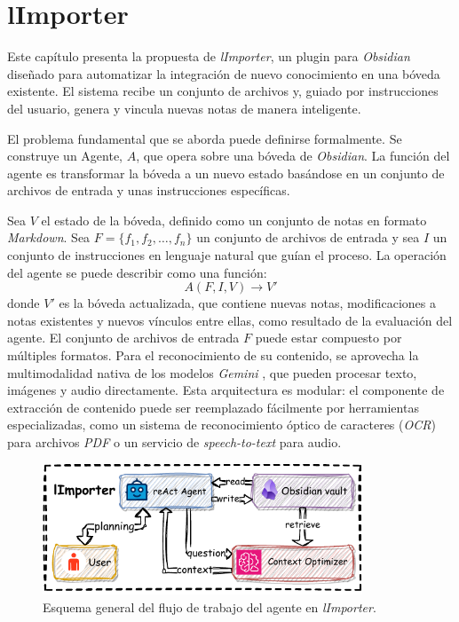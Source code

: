\chapter{lImporter}\label{chapter:proposal}
Este capítulo presenta la propuesta de \textit{lImporter}, un plugin para \textit{Obsidian} diseñado para automatizar la integración de nuevo conocimiento en una bóveda existente. El sistema recibe un conjunto de archivos y, guiado por instrucciones del usuario, genera y vincula nuevas notas de manera inteligente.

El problema fundamental que se aborda puede definirse formalmente. Se construye un Agente, $A$, que opera sobre una bóveda de \textit{Obsidian}. La función del agente es transformar la bóveda a un nuevo estado basándose en un conjunto de archivos de entrada y unas instrucciones específicas.

Sea $V$ el estado de la bóveda, definido como un conjunto de notas en formato \textit{Markdown}. Sea $F = \{f_1, f_2, \dots, f_n\}$ un conjunto de archivos de entrada y sea $I$ un conjunto de instrucciones en lenguaje natural que guían el proceso. La operación del agente se puede describir como una función:
\[ A(F, I, V) \rightarrow V' \]
donde $V'$ es la bóveda actualizada, que contiene nuevas notas, modificaciones a notas existentes y nuevos vínculos entre ellas, como resultado de la evaluación del agente. El conjunto de archivos de entrada $F$ puede estar compuesto por múltiples formatos. Para el reconocimiento de su contenido, se aprovecha la multimodalidad nativa de los modelos \textit{Gemini} \parencite{teamGeminiFamilyHighly2024}, que pueden procesar texto, imágenes y audio directamente. Esta arquitectura es modular: el componente de extracción de contenido puede ser reemplazado fácilmente por herramientas especializadas, como un sistema de reconocimiento óptico de caracteres (\textit{OCR}) para archivos \textit{PDF} o un servicio de \textit{speech-to-text} para audio.

\begin{figure}[h]
    \centering
    \includegraphics[width=0.85\textwidth]{figures/limporter.pdf}
    \caption{Esquema general del flujo de trabajo del agente en \textit{lImporter}.}
    \label{fig:importer_schema}
\end{figure}

